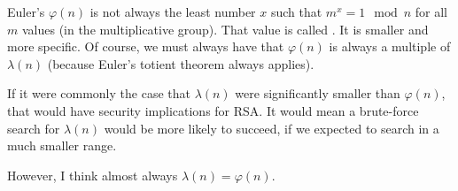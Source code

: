 \begin{remark}
  Euler's $\varphi(n)$ is not always the least number $x$ such that $m^x
  = 1 \mod n$ for all $m$ values (in the multiplicative group). That
  value is called . It is smaller
  and more specific. Of course, we must always have that $\varphi(n)$ is
  always a multiple of $\lambda(n)$ (because Euler's totient theorem
  always applies).

  If it were commonly the case that $\lambda(n)$ were significantly
  smaller than $\varphi(n)$, that would have security implications for
  RSA. It would mean a brute-force search for $\lambda(n)$ would be more
  likely to succeed, if we expected to search in a much smaller range.

  However, I think almost always $\lambda(n) = \varphi(n)$.
\end{remark}

